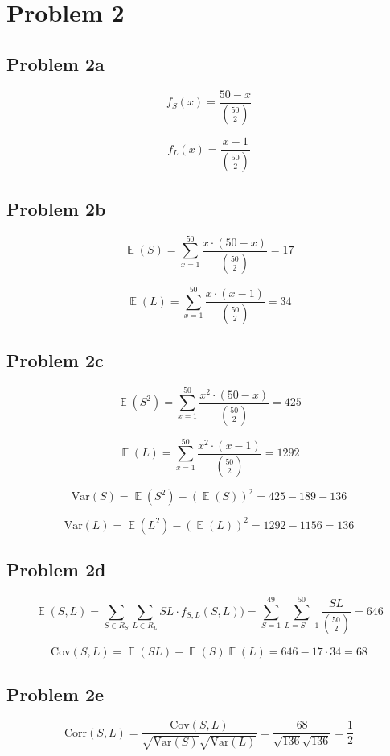 \documentclass{article}
\newcommand{\Var}{\mathrm{Var}}
\newcommand{\Cov}{\mathrm{Cov}}
\newcommand{\Corr}{\mathrm{Corr}}
\DeclareMathOperator{\EX}{\mathbb{E}}
\begin{document}
\section{Problem 2}

\subsection{Problem 2a}

$$f_S(x) = \frac{50 - x}{\binom{50}{2}}$$

$$f_L(x) = \frac{x - 1}{\binom{50}{2}}$$

\subsection{Problem 2b}

$$\EX(S) = \sum_{x = 1}^{50} \frac{x \cdot (50 - x)}{\binom{50}{2}} = 17$$

$$\EX(L) = \sum_{x = 1}^{50} \frac{x \cdot (x - 1)}{\binom{50}{2}} = 34$$

\subsection{Problem 2c}

$$\EX(S^2) = \sum_{x = 1}^{50} \frac{x^2 \cdot (50 - x)}{\binom{50}{2}} = 425$$

$$\EX(L) = \sum_{x = 1}^{50} \frac{x^2 \cdot (x - 1)}{\binom{50}{2}} = 1292$$

$$\Var(S) = \EX(S^2) - (\EX(S))^2 = 425 - 189 - 136$$

$$\Var(L) = \EX(L^2) - (\EX(L))^2 = 1292 - 1156 = 136$$

\subsection{Problem 2d}

$$\EX(S, L) = \sum_{S \in R_S}^{} \sum_{L \in R_L}^{} SL \cdot f_{S, L}(S, L)) = \sum_{S = 1}^{49} \sum_{L = S + 1}^{50} \frac{SL}{\binom{50}{2}} = 646$$

$$\Cov(S, L) = \EX(SL) - \EX(S)\EX(L) = 646 - 17 \cdot 34 = 68$$

\subsection{Problem 2e}

$$\Corr(S, L) = \frac{\Cov(S, L)}{\sqrt{\Var(S)}\sqrt{\Var(L)}} = \frac{68}{\sqrt{136}\sqrt{136}} = \frac{1}{2}$$
\end{document}
